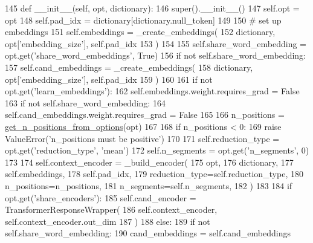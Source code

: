 \begin{DoxyCode}
145     \textcolor{keyword}{def }\_\_init\_\_(self, opt, dictionary):
146         super().\_\_init\_\_()
147         self.opt = opt
148         self.pad\_idx = dictionary[dictionary.null\_token]
149 
150         \textcolor{comment}{# set up embeddings}
151         self.embeddings = \_create\_embeddings(
152             dictionary, opt[\textcolor{stringliteral}{'embedding\_size'}], self.pad\_idx
153         )
154 
155         self.share\_word\_embedding = opt.get(\textcolor{stringliteral}{'share\_word\_embeddings'}, \textcolor{keyword}{True})
156         \textcolor{keywordflow}{if} \textcolor{keywordflow}{not} self.share\_word\_embedding:
157             self.cand\_embeddings = \_create\_embeddings(
158                 dictionary, opt[\textcolor{stringliteral}{'embedding\_size'}], self.pad\_idx
159             )
160 
161         \textcolor{keywordflow}{if} \textcolor{keywordflow}{not} opt.get(\textcolor{stringliteral}{'learn\_embeddings'}):
162             self.embeddings.weight.requires\_grad = \textcolor{keyword}{False}
163             \textcolor{keywordflow}{if} \textcolor{keywordflow}{not} self.share\_word\_embedding:
164                 self.cand\_embeddings.weight.requires\_grad = \textcolor{keyword}{False}
165 
166         n\_positions = \hyperlink{namespaceparlai_1_1agents_1_1transformer_1_1modules_ab67607512c597ddd54f2b60a1a1eaf4c}{get\_n\_positions\_from\_options}(opt)
167 
168         \textcolor{keywordflow}{if} n\_positions < 0:
169             \textcolor{keywordflow}{raise} ValueError(\textcolor{stringliteral}{'n\_positions must be positive'})
170 
171         self.reduction\_type = opt.get(\textcolor{stringliteral}{'reduction\_type'}, \textcolor{stringliteral}{'mean'})
172         self.n\_segments = opt.get(\textcolor{stringliteral}{'n\_segments'}, 0)
173 
174         self.context\_encoder = \_build\_encoder(
175             opt,
176             dictionary,
177             self.embeddings,
178             self.pad\_idx,
179             reduction\_type=self.reduction\_type,
180             n\_positions=n\_positions,
181             n\_segments=self.n\_segments,
182         )
183 
184         \textcolor{keywordflow}{if} opt.get(\textcolor{stringliteral}{'share\_encoders'}):
185             self.cand\_encoder = TransformerResponseWrapper(
186                 self.context\_encoder, self.context\_encoder.out\_dim
187             )
188         \textcolor{keywordflow}{else}:
189             \textcolor{keywordflow}{if} \textcolor{keywordflow}{not} self.share\_word\_embedding:
190                 cand\_embeddings = self.cand\_embeddings

\end{DoxyCode}
